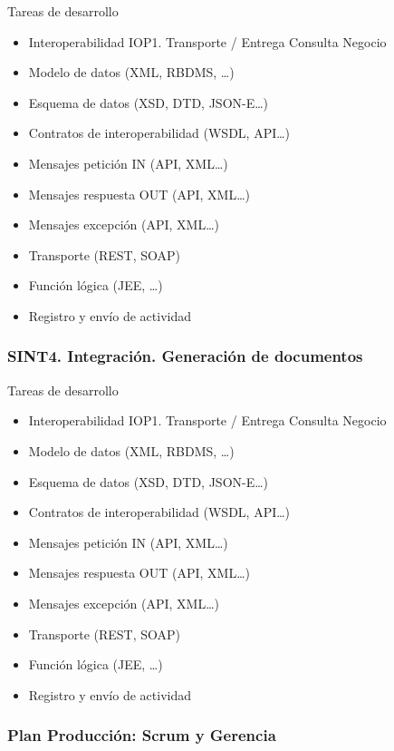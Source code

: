 \documentclass[
  paper=a4,
  ,captions=tableheading
]{scrartcl}
\providecommand{\tightlist}{%
  \setlength{\itemsep}{0pt}\setlength{\parskip}{0pt}}
\begin{document}
Tareas de desarrollo

\begin{itemize}
\tightlist
\item
  Interoperabilidad IOP1. Transporte / Entrega Consulta Negocio
\item
  Modelo de datos (XML, RBDMS, \ldots)
\item
  Esquema de datos (XSD, DTD, JSON-E\ldots)
\item
  Contratos de interoperabilidad (WSDL, API\ldots)
\item
  Mensajes petición IN (API, XML\ldots)
\item
  Mensajes respuesta OUT (API, XML\ldots)
\item
  Mensajes excepción (API, XML\ldots)
\item
  Transporte (REST, SOAP)
\item
  Función lógica (JEE, \ldots)
\item
  Registro y envío de actividad
\end{itemize}

\subsubsection{SINT4. Integración. Generación de
documentos}\label{sec:sint4.-integraciuxf3n.-generaciuxf3n-de-documentos}

Tareas de desarrollo

\begin{itemize}
\tightlist
\item
  Interoperabilidad IOP1. Transporte / Entrega Consulta Negocio
\item
  Modelo de datos (XML, RBDMS, \ldots)
\item
  Esquema de datos (XSD, DTD, JSON-E\ldots)
\item
  Contratos de interoperabilidad (WSDL, API\ldots)
\item
  Mensajes petición IN (API, XML\ldots)
\item
  Mensajes respuesta OUT (API, XML\ldots)
\item
  Mensajes excepción (API, XML\ldots)
\item
  Transporte (REST, SOAP)
\item
  Función lógica (JEE, \ldots)
\item
  Registro y envío de actividad
\end{itemize}

\subsubsection{Plan Producción: Scrum y
Gerencia}\label{sec:plan-producciuxf3n-scrum-y-gerencia}
\end{document}

